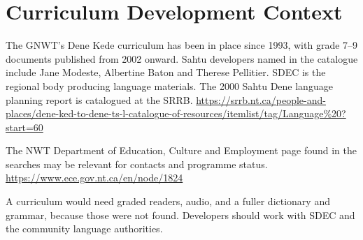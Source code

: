 \documentclass[12pt]{article}
\begin{document}
\section{Curriculum Development Context}
The GNWT's Dene Kede curriculum has been in place since 1993, with grade 7--9 documents published from 2002 onward. Sahtu developers named in the catalogue include Jane Modeste, Albertine Baton and Therese Pellitier. SDEC is the regional body producing language materials. The 2000 Sahtu Dene language planning report is catalogued at the SRRB. \url{https://srrb.nt.ca/people-and-places/dene-ked-to-dene-ts-l-catalogue-of-resources/itemlist/tag/Language%20?start=60}

The NWT Department of Education, Culture and Employment page found in the searches may be relevant for contacts and programme status. \url{https://www.ece.gov.nt.ca/en/node/1824}

A curriculum would need graded readers, audio, and a fuller dictionary and grammar, because those were not found. Developers should work with SDEC and the community language authorities.
\end{document}
